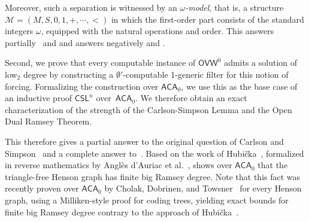 \documentclass{article}
\def\M{\mathcal{M}}
\newcommand{\RCA}[0]{\mathsf{RCA}}
\newcommand{\ACA}[0]{\mathsf{ACA}}
\newcommand{\RT}[0]{\mathsf{RT}}
\newcommand{\CSL}[0]{\mathsf{CSL}}
\newcommand{\OVW}[0]{\mathsf{OVW}}
\newcommand{\ODRT}[0]{\mathsf{ODRT}}
\numberwithin{theorem}{section}
\newtheorem{maintheorem}[theorem]{Main Theorem}
\theoremstyle{definition}
\newcommand{\ludovic}[1]{\textcolor{blue}{#1}}
\begin{document}

Moreover, such a separation is witnessed by an \emph{$\omega$-model}, that is, a structure $\M = (M, S, 0, 1, +, \cdots, <)$ in which the first-order part consists of the standard integers $\omega$, equipped with the natural operations and order. This answers partially~\cite[Question 11]{montalban2011open} and \cite[Problem 2]{miller2004effectiveness} and answers negatively \cite[Problem 1]{miller2004effectiveness} and \cite[Question 4.9]{liu2019computable}.

Second, we prove that every computable instance of $\OVW^0$ admits a solution of low${}_2$ degree
by constructing a $\emptyset'$-computable 1-generic filter for this notion of forcing. Formalizing the construction over $\ACA_0$, we use this as the base case of an inductive proof $\CSL^n$ over~$\ACA_0$. We therefore obtain an exact characterization of the strength of the Carlson-Simpson Lemma and the Open Dual Ramsey Theorem.


This therefore gives a partial answer to the original question of Carlson and Simpson~\cite{carlson1984dual}
and a complete answer to~\cite[Problem 3]{miller2004effectiveness}. Based on the work of
Hubi\v{c}ka~\cite{hubivcka2020big},
formalized in reverse mathematics by Anglès d’Auriac et al.~\cite{angles2023carlson},  shows over $\ACA_0$ that the triangle-free Henson graph has finite big Ramsey degree. Note that this fact was recently proven over $\ACA_0$ by Cholak, Dobrinen, and Towsner~\cite{cholak2026hensonupper} for every Henson graph, using a Milliken-style proof for coding trees, yielding exact bounds for finite big Ramsey degree contrary to the approach of
Hubi\v{c}ka~\cite{hubivcka2020big}.
\end{document}

